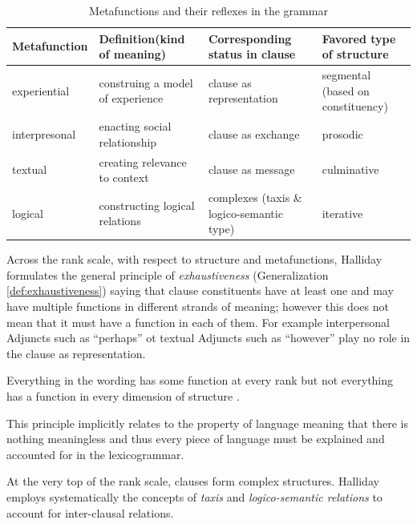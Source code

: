 \begin{table}[H]
	\centering
	\begin{tabulary}{\textwidth}{|l|L|L|L|}
		\hline
		{\bf Metafunction} & {\bf Definition(kind of meaning)} & {\bf Corresponding status in clause} & {\bf Favored type of structure}   \\ \hline
		experiential       & construing a model of experience  & clause as representation             & segmental (based on constituency) \\ \hline
		interpresonal      & enacting social relationship      & clause as exchange                   & prosodic                          \\ \hline
		textual            & creating relevance to context     & clause as message                    & culminative                       \\ \hline
		logical            & constructing logical relations    & complexes (taxis \& logico-semantic type) & iterative                         \\ \hline
	\end{tabulary}
	\caption{Metafunctions and their reflexes in the grammar}
	\label{tab:metafucntions}
\end{table}

Across the rank scale, with respect to structure and metafunctions, Halliday formulates the general principle of \textit{exhaustiveness} (Generalization \ref{def:exhaustiveness}) saying that clause constituents have at least one and may have multiple functions in different strands of meaning; however this does not mean that it must have a function in each of them. For example interpersonal Adjuncts such as ``perhaps'' ot textual Adjuncts such as ``however'' play no role in the clause as representation. 

\begin{generalization}\label{def:exhaustiveness}
    Everything in the wording has some function at every rank but not everything has a function in every dimension of structure \citep{Halliday2002,Halliday2013}.
\end{generalization}

This principle implicitly relates to the property of language meaning that 
there is nothing meaningless and thus every piece of language must be explained and accounted for in the lexicogrammar. 

At the very top of the rank scale, clauses form complex structures. Halliday employs systematically the concepts of \textit{taxis} and \textit{logico-semantic relations} to account for inter-clausal relations. 

